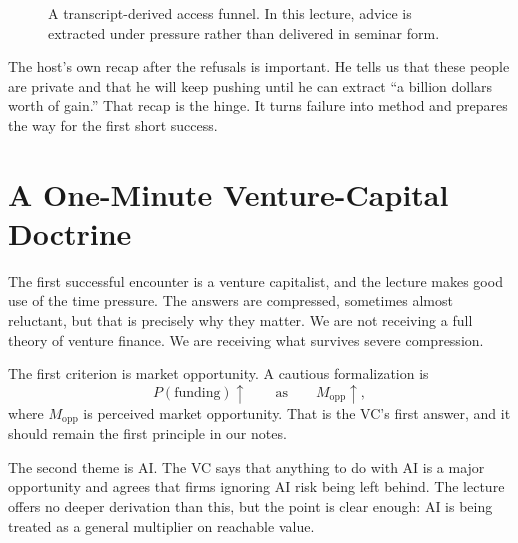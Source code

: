\begin{figure}[h]
\centering
{}
\caption{A transcript-derived access funnel. In this lecture, advice is extracted under pressure rather than delivered in seminar form.}
\end{figure}

The host's own recap after the refusals is important. He tells us that these people are private and that he will keep pushing until he can extract ``a billion dollars worth of gain.'' That recap is the hinge. It turns failure into method and prepares the way for the first short success.

\section{A One-Minute Venture-Capital Doctrine}

The first successful encounter is a venture capitalist, and the lecture makes good use of the time pressure. The answers are compressed, sometimes almost reluctant, but that is precisely why they matter. We are not receiving a full theory of venture finance. We are receiving what survives severe compression.

The first criterion is market opportunity. A cautious formalization is
\begin{equation}
P(\text{funding}) \uparrow
\qquad \text{as} \qquad
M_{\text{opp}} \uparrow,
\end{equation}
where \(M_{\text{opp}}\) is perceived market opportunity. That is the VC's first answer, and it should remain the first principle in our notes.

The second theme is AI. The VC says that anything to do with AI is a major opportunity and agrees that firms ignoring AI risk being left behind. The lecture offers no deeper derivation than this, but the point is clear enough: AI is being treated as a general multiplier on reachable value.

